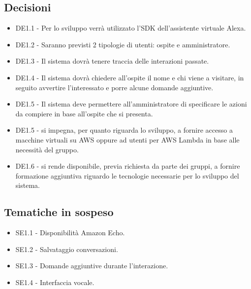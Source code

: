 \documentclass[a4paper,titlepage]{article}
\begin{document}
 \subsection{Decisioni}
 \begin{itemize}
  \item DE1.1 - Per lo sviluppo verrà utilizzato l'SDK dell'assistente virtuale Alexa.
  \item DE1.2 - Saranno previsti 2 tipologie di utenti: ospite e amministratore.
  \item DE1.3 - Il sistema dovrà tenere traccia delle interazioni passate.
  \item DE1.4 - Il sistema dovrà chiedere all'ospite il nome e chi viene a visitare, in seguito avvertire l'interessato e porre alcune domande aggiuntive.
  \item DE1.5 - Il sistema deve permettere all'amministratore di specificare le azioni da compiere in base all'ospite che si presenta.
  \item DE1.5 - \PROPONENTE{} si impegna, per quanto riguarda lo sviluppo, a fornire accesso a macchine virtuali su AWS oppure ad utenti per AWS Lambda in base alle necessità del gruppo.
  \item DE1.6 - \PROPONENTE{} si rende disponibile, previa richiesta da parte dei gruppi, a fornire formazione aggiuntiva riguardo le tecnologie necessarie per lo sviluppo del sistema.
 \end{itemize}

\subsection{Tematiche in sospeso} 
  \begin{itemize}
  \item SE1.1 - Disponibilità Amazon Echo.
  \item SE1.2 - Salvataggio conversazioni.
  \item SE1.3 - Domande aggiuntive durante l'interazione.
  \item SE1.4 - Interfaccia vocale.
  \end{itemize}
\end{document}
